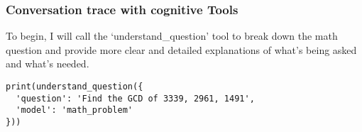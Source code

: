 \subsubsection*{Conversation trace with cognitive Tools}

\begin{tcolorbox}[colback=green!5, colframe=black, arc=2pt, boxrule=0.5pt]
To begin, I will call the `understand\_question' tool to break down the
math question and provide more clear and detailed explanations of what’s
being asked and what’s needed.\\

\begin{lstlisting}[style=pythonstyle]
print(understand_question({
  'question': 'Find the GCD of 3339, 2961, 1491',
  'model': 'math_problem'
}))
\end{lstlisting}
\end{tcolorbox}



